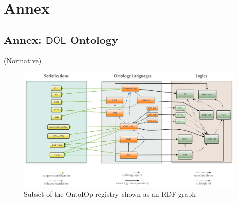 \documentclass[10pt,fleqn,final]{scrreprt}
\makeatletter
\newcommand*\CommentAuthor{}
\renewcommand*\CommentAuthor{#1}}
\newcommand*\CommentDate{}
\renewcommand*\CommentDate{#1}}
\newcommand*\CommentId{}
\renewcommand*\CommentId{#1}}
\newcommand*\CommentType{}
\renewcommand*\CommentType{#1}}
\newcommand*{\SetCommentColorByType}[1]{%
\edef\localType{{#1}}%
\expandafter\ifstrequal\localType{q-aut}{\colorlet{CommentColor}{red}}{%
\expandafter\ifstrequal\localType{q-all}{\colorlet{CommentColor}{orange}}{%
\expandafter\ifstrequal\localType{todo}{\colorlet{CommentColor}{orange}}{%
\expandafter\ifstrequal\localType{fyi}{\colorlet{CommentColor}{lightgray}}{%
\colorlet{CommentColor}{yellow}}}}}}
\newcommand*{\SetCommentPrefixByType}[1]{%
\edef\localType{{#1}}%
\expandafter\@ifmtarg\localType{%
\edef\CommentPrefix{}%
}{%
\caseupper[q]{#1}%
\edef\CommentPrefix{\thestring: }%
}}
\newcommand*{\initComment}[1]{%
\setkeys{Comment}{#1}%
\SetCommentColorByType{\CommentType}%
\relax%
\SetCommentPrefixByType{\CommentType}%
\relax%
}
\newcommand*{\todonote}[2][]{%
\initComment{#1}%
\pdfcomment[author=\CommentAuthor,color=CommentColor,date=\CommentDate,id=\CommentId]{%
\CommentPrefix
#2}}
\renewcommand*{\todonote}[2][]{%
\initComment{#1}%
\ednote{\CommentPrefix #2}}
\newcommand*{\CL}{\ensuremath{\mathsf{CL}}\xspace}
\newcommand*{\DOL}{\ensuremath{\mathsf{DOL}}\xspace}
\newcommand{\normative}[0]{{\begin{center}{\Large{(Normative})}\end{center}} \bigskip}
\newcommand{\sclause}[1]{\section{#1}}
\newcommand{\normannex}[1]{ \chapter{Annex: #1} \normative}
\newenvironment{definitions}[0]{\medskip }{}
\makeatother
\begin{document}
\begin{definitions}
%
%






\part*{Annex}

\appendix

\normannex{\DOL Ontology}
\label{a:dol-onto}

\begin{figure}
\centering
   \includegraphics[width=\textwidth]{illustrations/DOL-ontograph-layers-OMG} 
  \caption{Subset of the OntoIOp registry, shown as an RDF graph}
\label{f:DOL-threelayers}
\end{figure}


\end{definitions}
\end{document}
